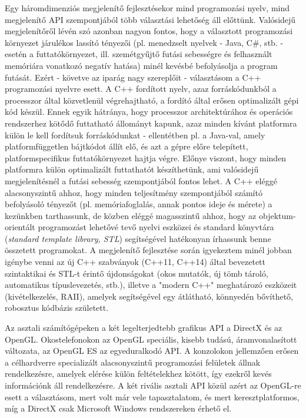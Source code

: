 Egy háromdimenziós megjelenítő fejlesztésekor mind programozási nyelv, mind megjelenítő API szempontjából több választási lehetőség áll előttünk. Valósidejű megjelenítőről lévén szó azonban nagyon fontos, hogy a választott programozási környezet járulékos lassító tényezői (pl. menedzselt nyelvek - Java, C\#, stb. - esetén a futtatókörnyezet, ill. szemétgyűjtő futási sebességre és felhasznált memóriára vonatkozó negatív hatása) minél kevésbé befolyásolja a program futását. Ezért - követve az iparág nagy szereplőit - választásom a C++ programozási nyelvre esett. A C++ fordított nyelv, azaz forráskódunkból a processzor által közvetlenül végrehajtható, a fordító által erősen optimalizált gépi kód készül. Ennek egyik hátránya, hogy processzor architektúrához és operációs rendszerhez kötődő futtatható állományt kapunk, azaz minden kívánt platformra külön le kell fordítsuk forráskódunkat - ellentétben pl. a Java-val, amely platformfüggetlen bájtkódot állít elő, és azt a gépre előre telepített, platformspecifikus futtatókörnyezet hajtja végre. Előnye viszont, hogy minden platformra külön optimalizált futtathatót készíthetünk, ami valósidejű megjelenítésnél a futási sebesség szempontjából fontos lehet. A C++ eléggé alacsonyszintű ahhoz, hogy minden teljesítmény szempontjából számító befolyásoló tényezőt (pl. memóriafoglalás, annak pontos ideje és mérete) a kezünkben tarthassunk, de közben eléggé magasszintű ahhoz, hogy az objektum-orientált programozást lehetővé tevő nyelvi eszközei és standard könyvtára (\textit{standard template library, STL}) segítségével hatékonyan írhassunk benne összetett programokat. A megjelenítő fejlesztése során igyekeztem minél jobban igénybe venni az új C++ szabványok (C++11, C++14) által bevezetett szintaktikai és STL-t érintő újdonságokat (okos mutatók, új tömb tároló, automatikus típuslevezetés, stb.), illetve a "modern C++" meghatározó eszközeit (kivételkezelés, RAII), amelyek segítségével egy átlátható, könnyedén bővíthető, robosztus kódbázis született.

Az asztali számítógépeken a két legelterjedtebb grafikus API a DirectX és az OpenGL. Okostelefonokon az OpenGL speciális, kisebb tudású, áramvonalasított változata, az OpenGL ES az egyeduralkodó API. A konzolokon jellemzően erősen a célhardverre specializált alacsonyszintű programozási felületek állnak rendelkezésre, amelyek elérése külön feltételekhez kötött, így ezekről kevés információnk áll rendelkezésre. A két rivális asztali API közül azért az OpenGL-re esett a választásom, mert volt már vele tapasztalatom, és mert keresztplatformos, míg a DirectX csak Microsoft Windows rendszereken érhető el.

